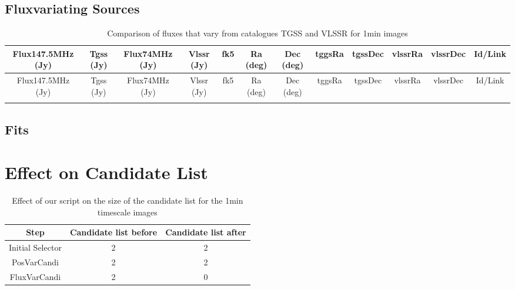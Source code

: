 \documentclass{article}
\begin{document}
\begin{landscape}

\section{Fluxvariating Sources}\label{varsection:FinalTestSourceSubINV:1min}

\begin{longtable}{c|c|c|c|c|c|c|c|c|c|c|c} 
\toprule 
Flux147.5MHz (Jy) & Tgss (Jy) & Flux74MHz (Jy)& Vlssr (Jy) & fk5 & Ra (deg) & Dec (deg) &tggsRa&tgssDec&vlssrRa&vlssrDec& Id/Link \\\midrule 
\endfirsthead 
\toprule 
Flux147.5MHz (Jy) & Tgss (Jy) & Flux74MHz (Jy)& Vlssr (Jy)& fk5 & Ra (deg) & Dec (deg)  &tggsRa&tgssDec&vlssrRa&vlssrDec& Id/Link \\\midrule 
\endhead 
\bottomrule 
\endfoot 
\bottomrule
\caption{ Comparison of fluxes that vary from catalogues TGSS and VLSSR for 1min images} 
\endlastfoot
\label{FinalTestSourceSubINV:1min:tablevar}
\end{longtable}

\end{landscape}

\subsection{Fits}
\section{Effect on Candidate List}
\begin{table}[H]
    \centering
    \begin{tabular}{|c| c | c|}
    \toprule
     Step & Candidate list before & Candidate list after\\
    \midrule
        Initial Selector & 2 & 2 \\
        PosVarCandi & 2 & 2 \\
        FluxVarCandi & 2 & 0  \\
        \midrule
    \end{tabular}
    \caption{Effect of our script on the size of the candidate list for the 1min timescale images}
    \label{FinalTestSourceSubINV:1min:overviewcandidates}
\end{table}
\end{document}

